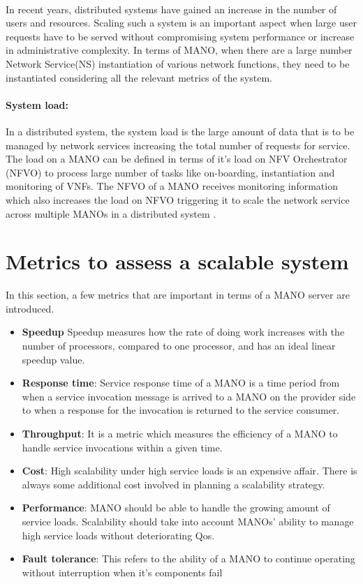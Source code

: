 \paragraph{}
In recent years, distributed systems have gained an increase in the number of users and resources. Scaling such a system is an important aspect when large user requests have to be served without compromising system performance or increase in administrative complexity. In terms of MANO, when there are a large number Network Service(NS) instantiation of various network functions, they need to be instantiated considering all the relevant metrics of the system.

\paragraph{System load:}
In a distributed system, the system load is the large amount of data that is to be managed by network services increasing the total number of requests for service.
The load on a MANO can be defined in terms of it's load on NFV Orchestrator (NFVO) to process large number of tasks like on-boarding, instantiation and monitoring of VNFs. The NFVO of a MANO receives monitoring information which also increases the load on NFVO triggering it to scale the network service across multiple MANOs in a distributed system \cite{soenen2017optimising}.


\section{Metrics to assess a scalable system}
\label{Metrics}
In this section, a few metrics that are important in terms of a MANO server are introduced.

\begin{itemize}
	\item \textbf{Speedup} Speedup measures how the  rate of doing work increases with the number of processors, compared to one processor, and has an ideal linear speedup value. \cite{jogalekar_evaluating_2000}
	\item  \textbf{Response time}: Service response time of a MANO is a time period from when a service invocation message is arrived to a MANO on the provider side to when a response for the invocation is returned to the service consumer.
	\item \textbf {Throughput}: It is a metric which measures the efficiency of a MANO to handle service invocations within a given time.
	\item \textbf{Cost}: High scalability under high service loads is an expensive affair. There is always some additional cost involved in planning a scalability strategy.
	\item \textbf{Performance}: MANO should be able to handle the growing amount of service loads. Scalability should take into account MANOs' ability to manage high service loads without deteriorating Qos.
	\item \textbf{Fault tolerance}: This refers to the ability of a MANO to continue operating without interruption when it's components fail
\end{itemize}


